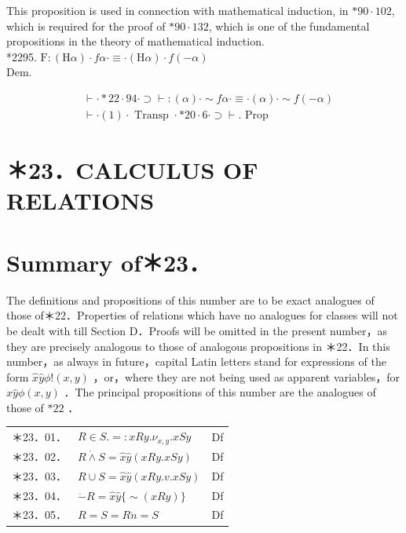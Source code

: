 \documentclass[10pt]{article}
\begin{document}
This proposition is used in connection with mathematical induction, in $* 90 \cdot 102$, which is required for the proof of $* 90 \cdot 132$, which is one of the fundamental propositions in the theory of mathematical induction.\\
*2295. $\mathrm{F}:(\mathrm{H} \alpha) \cdot f \alpha \cdot \equiv \cdot(\mathrm{H} \alpha) \cdot f(-\alpha)$\\
Dem.


\begin{align*}
& \vdash \cdot * 22 \cdot 94 \cdot \supset \vdash:(\alpha) \cdot \sim f \alpha \cdot \equiv \cdot(\alpha) \cdot \sim f(-\alpha)  \tag{1}\\
& \vdash \cdot(1) \cdot \text { Transp } \cdot * 20 \cdot 6 \cdot \supset \vdash \text {. Prop }
\end{align*}


\section*{＊23．CALCULUS OF RELATIONS}
\section*{Summary of＊23．}
The definitions and propositions of this number are to be exact analogues of those of＊22．Properties of relations which have no analogues for classes will not be dealt with till Section D．Proofs will be omitted in the present number，as they are precisely analogous to those of analogous propositions in ＊22．In this number，as always in future，capital Latin letters stand for expressions of the form $\hat{x} \hat{y} \phi!(x, y)$ ，or，where they are not being used as apparent variables，for $\hat{x} \hat{y} \phi(x, y)$ ．The principal propositions of this number are the analogues of those of $* 22$ ．

\begin{center}
\begin{tabular}{lll}
＊23．01． & $R \in S .=: x R y . \nu_{x, y} . x S y$ & Df \\
＊23．02． & $R \dot{\wedge} S=\hat{x} \hat{y}(x R y . x S y)$ & Df \\
＊23．03． & $R \cup S=\hat{x} \hat{y}(x R y . v . x S y)$ & Df \\
＊23．04． & $\dot{-} R=\hat{x} \hat{y}\{\sim(x R y)\}$ & Df \\
＊23．05． & $R=S=R \dot{n}=S$ & Df \\
\end{tabular}
\end{center}
\end{document}

